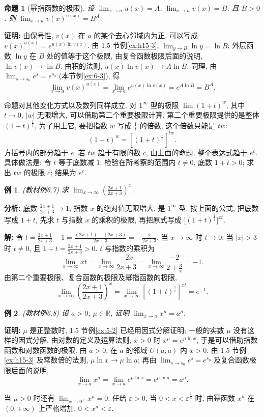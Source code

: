 \documentclass[UTF8,openany]{ctexbook}
\theoremstyle{chinesetextbook}
\newtheorem{example}{例}[section]
\newenvironment{cnproof}{\par\indent\textbf{证明:} \ignorespaces}{\par}
\newenvironment{cnsolution}{\par\indent\textbf{解:} \ignorespaces}{\par}
\newtheorem*{propositionsingle}{命题}
\begin{document}
\begin{propositionsingle}[幂指函数的极限]
设 $\displaystyle\lim_{x\to a}u(x)=A$, $\displaystyle\lim_{x\to a}v(x)=B$, 且 $B>0$. 则 $\displaystyle\lim_{x\to a}v(x)^{u(x)}=B^A$.
\end{propositionsingle}
\begin{cnproof}
由保号性, $v(x)$ 在 $a$ 的某个去心邻域内为正, 可以写成 $v(x)^{u(x)}=e^{u(x)\ln v(x)}$. 由 1.5 节例\ref{ex:h15-3}, $\displaystyle\lim_{y\to B}\ln y=\ln B$; 外层函数 $\ln y$ 在 $B$ 处的值等于这个极限, 由复合函数极限后面的说明, $\ln v(x)\to\ln B$. 由积的法则, $u(x)\ln v(x)\to A\ln B$. 同理, 由 $\displaystyle\lim_{s\to s_0}e^s=e^{s_0}$ (本节例\ref{ex:6-3}), 得
\[
\lim_{x\to a}v(x)^{u(x)}=\lim_{x\to a}e^{u(x)\ln v(x)}=e^{A\ln B}=B^A.
\]
\end{cnproof}
命题对其他变化方式以及数列同样成立. 对 $1^\infty$ 型的极限 $\displaystyle\lim(1+t)^w$, 其中 $t\to0$, $|w|$ 无限增大, 可以借助第二个重要极限计算. 第二个重要极限提供的是整体 $(1+t)^{\frac1t}$, 为了用上它, 要把指数 $w$ 写成 $\displaystyle\frac1t$ 的倍数, 这个倍数只能是 $tw$:
\[
(1+t)^w=\left[(1+t)^{\frac1t}\right]^{tw}.
\]
方括号内的部分趋于 $e$. 若 $tw$ 趋于有限的数 $c$, 由上面的命题, 整个表达式趋于 $e^c$. 具体做法是: 令 $t$ 等于底数减 $1$; 检验在所考察的范围内 $t\ne0$, 底数 $1+t>0$; 求出 $tw$ 的极限 $c$; 结果为 $e^c$.
\begin{example}\label{ex:6-7}
\textnormal{(教材例6.7)} 求 $\displaystyle\lim_{x\to\infty}\left(\frac{2x+1}{2x+3}\right)^x$.
\end{example}
\par\indent\textbf{分析:} 底数 $\displaystyle\frac{2x+1}{2x+3}\to1$, 指数 $x$ 的绝对值无限增大, 是 $1^\infty$ 型. 按上面的公式, 把底数写成 $1+t$, 先求 $t$ 与指数 $x$ 的乘积的极限, 再把原式写成 $\bigl[(1+t)^{\frac1t}\bigr]^{xt}$.
\begin{cnsolution}
令 $\displaystyle t=\frac{2x+1}{2x+3}-1=\frac{(2x+1)-(2x+3)}{2x+3}=-\frac2{2x+3}$. 当 $x\to\infty$ 时 $t\to0$; 当 $|x|>3$ 时 $t\ne0$, 且 $\displaystyle1+t=\frac{2x+1}{2x+3}>0$. $t$ 与指数的乘积为
\[
\lim_{x\to\infty}xt=\lim_{x\to\infty}\frac{-2x}{2x+3}=\lim_{x\to\infty}\frac{-2}{2+\frac3x}=-1.
\]
由第二个重要极限、复合函数的极限及幂指函数的极限,
\[
\lim_{x\to\infty}\left(\frac{2x+1}{2x+3}\right)^x=\lim_{x\to\infty}\left[(1+t)^{\frac1t}\right]^{xt}=e^{-1}.
\]
\end{cnsolution}
\begin{example}\label{ex:6-8}
\textnormal{(教材例6.8)} 设 $a>0$, $\mu\in\mathbb R$, 证明 $\displaystyle\lim_{x\to a}x^\mu=a^\mu$.
\end{example}
\begin{cnproof}
$\mu$ 是正整数时, 1.5 节例\ref{ex:5-2} 已经用因式分解证明; 一般的实数 $\mu$ 没有这样的因式分解. 由对数的定义及运算法则, $x>0$ 时 $x^\mu=e^{\mu\ln x}$, 于是可以借助指数函数和对数函数的极限. 由 $a>0$, 在 $a$ 的邻域 $U(a,a)$ 内 $x>0$. 由 1.5 节例\ref{ex:h15-3} 及常数倍的法则, $\mu\ln x\to\mu\ln a$; 再由 $\displaystyle\lim_{s\to s_0}e^s=e^{s_0}$ 及复合函数极限后面的说明,
\[
\lim_{x\to a}x^\mu=\lim_{x\to a}e^{\mu\ln x}=e^{\mu\ln a}=a^\mu.
\]
\end{cnproof}
当 $\mu>0$ 时还有 $\displaystyle\lim_{x\to0^+}x^\mu=0$: 任给 $\varepsilon>0$, 当 $0<x<\varepsilon^{\frac1\mu}$ 时, 由幂函数 $x^\mu$ 在 $(0,+\infty)$ 上严格增加, $0<x^\mu<\varepsilon$.
\end{document}
